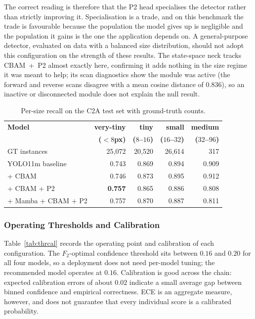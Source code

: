 The correct reading is therefore that the P2 head specialises the detector
rather than strictly improving it. Specialisation is a trade, and on this
benchmark the trade is favourable because the population the model gives up is
negligible and the population it gains is the one the application depends on. A
general-purpose detector, evaluated on data with a balanced size distribution,
should not adopt this configuration on the strength of these results. The state-space neck tracks CBAM~+~P2 almost exactly
here, confirming it adds nothing in the size regime it was meant to help; its
scan diagnostics show the module was active (the forward and reverse scans
disagree with a mean cosine distance of $0.836$), so an inactive or disconnected
module does not explain the null result.

\begin{table}[tbp]
  \centering
  \caption{Per-size recall on the C2A test set with ground-truth counts.}
  \label{tab:persize}
  \begin{tabular}{@{}l r r r r@{}}
    \toprule
    \bfseries\boldmath Model& \bfseries\boldmath very-tiny& \bfseries\boldmath tiny& \bfseries\boldmath small& \bfseries\boldmath medium\\
    & \bfseries\boldmath ($<8$px)& \bfseries\boldmath ($8$--$16$)& \bfseries\boldmath ($16$--$32$)& \bfseries\boldmath ($32$--$96$)\\
    GT instances & 25{,}072 & 20{,}520 & 26{,}614 & 317 \\
    \midrule
    YOLO11m baseline    & 0.743 & 0.869 & 0.894 & 0.909 \\
    + CBAM              & 0.746 & 0.873 & 0.895 & 0.912 \\
    + CBAM + P2         & \textbf{0.757} & 0.865 & 0.886 & 0.808 \\
    + Mamba + CBAM + P2 & 0.757 & 0.870 & 0.887 & 0.811 \\
    \bottomrule
  \end{tabular}
\end{table}

\subsubsection{Operating Thresholds and Calibration}
Table~\ref{tab:thrcal} records the operating point and calibration of each
configuration. The $F_2$-optimal confidence threshold sits between $0.16$ and
$0.20$ for all four models, so a deployment does not need per-model tuning;
the recommended model operates at $0.16$. Calibration is good across the
chain: expected calibration errors of about $0.02$ indicate a small average
gap between binned confidence and empirical correctness. ECE is an aggregate
measure, however, and does not guarantee that every individual score is a
calibrated probability.


